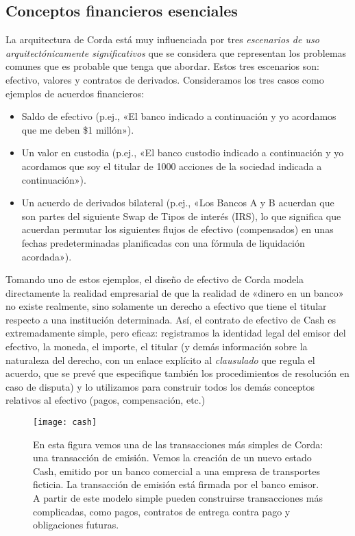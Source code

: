 \documentclass{article}
\begin{document}
\subsection{Conceptos financieros esenciales}
La arquitectura de Corda está muy influenciada por tres \textit{escenarios de uso arquitectónicamente significativos} que se considera que representan los problemas comunes que es probable que tenga que abordar.  Estos tres escenarios son: efectivo, valores y contratos de derivados. Consideramos los tres casos como ejemplos de acuerdos financieros:
\begin{itemize}
\item Saldo de efectivo (p.ej., «El banco indicado a continuación y yo acordamos que me deben \$1 millón»).
\item Un valor en custodia (p.ej., «El banco custodio indicado a continuación y yo acordamos que soy el titular de 1000 acciones de la sociedad indicada a continuación»).
\item Un acuerdo de derivados bilateral (p.ej., «Los Bancos A y B acuerdan que son partes del siguiente Swap de Tipos de interés (IRS), lo que significa que acuerdan permutar los siguientes flujos de efectivo (compensados) en unas fechas predeterminadas planificadas con una fórmula de liquidación acordada»).
\end{itemize}
Tomando uno de estos ejemplos, el diseño de efectivo de Corda modela directamente la realidad empresarial de que la realidad de «dinero en un banco» no existe realmente, sino solamente un derecho a efectivo que tiene el titular respecto a una institución determinada.\cite{BOE} Así, el contrato de efectivo de Cash es extremadamente simple, pero eficaz: registramos la identidad legal del emisor del efectivo, la moneda, el importe, el titular (y demás información sobre la naturaleza del derecho, con un enlace explícito al \textit{clausulado} que regula el acuerdo, que se prevé que especifique también los procedimientos de resolución en caso de disputa) y lo utilizamos para construir todos los demás conceptos relativos al efectivo (pagos, compensación, etc.)
\begin{figure}[H]
\texttt{[image: cash]}
\caption{En esta figura vemos una de las transacciones más simples de Corda: una transacción de emisión.  Vemos la creación de un nuevo estado Cash, emitido por un banco comercial a una empresa de transportes ficticia. La transacción de emisión está firmada por el banco emisor.  A partir de este modelo simple pueden construirse transacciones más complicadas, como pagos, contratos de entrega contra pago y obligaciones futuras.}
\end{figure}
\end{document}

